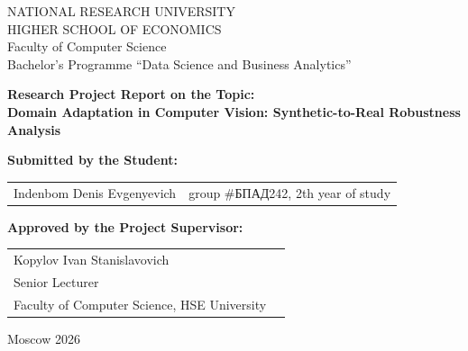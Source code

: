 \begin{titlepage}
	\newpage

	{
		\begin{center}
			NATIONAL RESEARCH UNIVERSITY\\
			HIGHER SCHOOL OF ECONOMICS
			\\
			\bigskip
			Faculty of Computer Science\\
			Bachelor’s Programme “Data Science and Business Analytics”
		\end{center}
	}


	\begin{center}
		{\bf Research Project Report on the Topic:}\\
		{\bf Domain Adaptation in Computer Vision: Synthetic-to-Real Robustness Analysis}\\
	\end{center}

	\vspace{2em}

	{\bf Submitted by the Student: \vspace{2mm}}

	{
		\begin{tabular}{l@{\hskip 1.5cm}l}
			Indenbom Denis Evgenyevich &
			group \#\foreignlanguage{russian}{БПАД}242, 2th year of study
		\end{tabular}}

	\vspace{1em}
	{\bf Approved by the Project Supervisor: \vspace{2mm}}

	{
		\begin{tabular}{l@{\hskip 1.5cm}l}
			Kopylov Ivan Stanislavovich \\
			Senior Lecturer             \\
			Faculty of Computer Science, HSE University
		\end{tabular}}

	\vspace{\fill}

	\begin{center}
		Moscow 2026
	\end{center}

\end{titlepage}